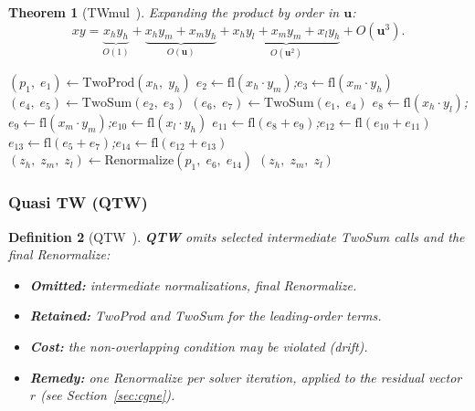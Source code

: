 \documentclass[12pt,a4paper]{article}
\newtheorem{theorem}{Theorem}[section]
\newtheorem{definition}[theorem]{Definition}
\newcommand{\fl}{\mathrm{fl}}
\newcommand{\uu}{\mathbf{u}}
\begin{document}
\begin{theorem}[TWmul~\cite{Fabiano2019}]
Expanding the product by order in $\uu$:
\begin{equation}
  xy = \underbrace{x_h y_h}_{O(1)}
     + \underbrace{x_h y_m + x_m y_h}_{O(\uu)}
     + \underbrace{x_h y_l + x_m y_m + x_l y_h}_{O(\uu^2)}
     + O(\uu^3).
\end{equation}

\begin{algorithm}[H]
\caption{$\mathrm{TWmul}(x_h,x_m,x_l,\; y_h,y_m,y_l) \to (z_h,z_m,z_l)$}
\begin{algorithmic}[1]
\State $(p_1,\; e_1) \leftarrow \mathrm{TwoProd}(x_h,\; y_h)$
\State $e_2 \leftarrow \fl(x_h \cdot y_m)$;\quad $e_3 \leftarrow \fl(x_m \cdot y_h)$
\State $(e_4,\; e_5) \leftarrow \mathrm{TwoSum}(e_2,\; e_3)$
\State $(e_6,\; e_7) \leftarrow \mathrm{TwoSum}(e_1,\; e_4)$
\State $e_8 \leftarrow \fl(x_h \cdot y_l)$;\quad $e_9 \leftarrow \fl(x_m \cdot y_m)$;\quad $e_{10} \leftarrow \fl(x_l \cdot y_h)$
\State $e_{11} \leftarrow \fl(e_8 + e_9)$;\quad $e_{12} \leftarrow \fl(e_{10} + e_{11})$
\State $e_{13} \leftarrow \fl(e_5 + e_7)$;\quad $e_{14} \leftarrow \fl(e_{12} + e_{13})$
\State $(z_h,\; z_m,\; z_l) \leftarrow \mathrm{Renormalize}(p_1,\; e_6,\; e_{14})$
\State \Return $(z_h,\; z_m,\; z_l)$
\end{algorithmic}
\end{algorithm}
\end{theorem}

\subsubsection{Quasi TW (QTW)}

\begin{definition}[QTW~\cite{Mukunoki2025}]
\textbf{QTW} omits selected intermediate TwoSum calls and the final Renormalize:
\begin{itemize}
  \item \textbf{Omitted:} intermediate normalizations, final Renormalize.
  \item \textbf{Retained:} TwoProd and TwoSum for the leading-order terms.
  \item \textbf{Cost:} the non-overlapping condition may be violated (drift).
  \item \textbf{Remedy:} one Renormalize per solver iteration, applied to the
        residual vector $r$ (see Section~\ref{sec:cgne}).
\end{itemize}
\end{definition}
\end{document}
